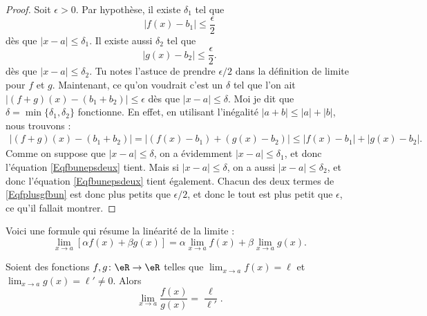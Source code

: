 \begin{proof}
    Soit $\epsilon>0$. Par hypothèse, il existe $\delta_1$ tel que
    \begin{equation}    \label{Eqfbunepsdeux}
      | f(x)-b_1 |\leq \frac{ \epsilon }{ 2 }
    \end{equation}
    dès que $| x-a |\leq\delta_1$. Il existe aussi $\delta_2$ tel que
    \begin{equation}    \label{Eqgbdeuxepsdeux}
      | g(x)-b_2 |\leq \frac{ \epsilon }{ 2 }.
    \end{equation}
    dès que $| x-a |\leq \delta_2$. Tu notes l'astuce de prendre $\epsilon/2$ dans la définition de limite pour $f$ et $g$. Maintenant, ce qu'on voudrait c'est un $\delta$ tel que l'on ait $| (f+g)(x)-(b_1+b_2) |\leq \epsilon$ dès que $| x-a |\leq \delta$. Moi je dit que $\delta=\min\{ \delta_1,\delta_2 \}$ fonctionne. En effet, en utilisant l'inégalité $| a+b |\leq | a |+| b |$, nous trouvons :
    \begin{align}
    | (f+g)(x)-(b_1+b_2) |=| (f(x)-b_1)+(g(x)-b_2) |
            \leq | f(x)-b_1 |+| g(x)-b_2 |.     \label{Eqfplusgfbun}
    \end{align}
    Comme on suppose que $| x-a |\leq\delta$, on a évidemment $| x-a |\leq\delta_1$, et donc l'équation \eqref{Eqfbunepsdeux} tient. Mais si $| x-a |\leq\delta$, on a aussi $| x-a |\leq\delta_2$, et donc l'équation  \eqref{Eqfbunepsdeux} tient également. Chacun des deux termes de \eqref{Eqfplusgfbun} est donc plus petits que $\epsilon/2$, et donc le tout est plus petit que $\epsilon$, ce qu'il fallait montrer.

\end{proof}

Voici une formule qui résume la linéarité de la limite :
\begin{equation}    \label{EqLimLinRes}
    \lim_{x\to a}[\alpha f(x)+\beta g(x)]=\alpha\lim_{x\to a}f(x)+\beta\lim_{x\to a}g(x).
\end{equation}

\begin{proposition}      \label{PROPooOUPNooTrClHw}
    Soient des fonctions \( f,g\colon \eR\to \eR\) telles que \( \lim_{x\to a} f(x)=\ell\) et \( \lim_{x\to a} g(x)=\ell'\neq 0\). Alors
    \begin{equation}
        \lim_{x\to a} \frac{ f(x) }{ g(x) }=\frac{ \ell }{ \ell' }.
    \end{equation}
\end{proposition}

